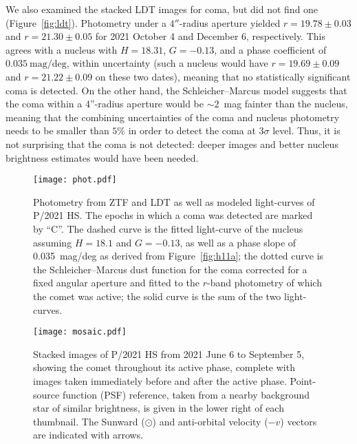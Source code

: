 \documentclass[modern]{aastex631}
\begin{document}
\begin{CJK*}{UTF8}{gbsn}
We also examined the stacked LDT images for coma, but did not find one (Figure~\ref{fig:ldt}). Photometry under a $4''$-radius aperture yielded $r=19.78\pm0.03$ and $r=21.30\pm0.05$ for 2021 October 4 and December 6, respectively. This agrees with a nucleus with $H=18.31$, $G=-0.13$, and a phase coefficient of $0.035~\mathrm{mag/deg}$, within uncertainty (such a nucleus would have $r=19.69\pm0.09$ and $r=21.22\pm0.09$ on these two dates), meaning that no statistically significant coma is detected. On the other hand, the Schleicher--Marcus model suggests that the coma within a 4''-radius aperture would be $\sim2$~mag fainter than the nucleus, meaning that the combining uncertainties of the coma and nucleus photometry needs to be smaller than $5\%$ in order to detect the coma at $3\sigma$ level. Thus, it is not surprising that the coma is not detected: deeper images and better nucleus brightness estimates would have been needed.

\begin{figure*}[h!]
\begin{center}
\texttt{[image: phot.pdf]}
\caption{Photometry from ZTF and LDT as well as modeled light-curves of P/2021 HS. The epochs in which a coma was detected are marked by ``C''. The dashed curve is the fitted light-curve of the nucleus assuming $H=18.1$ and $G=-0.13$, as well as a phase slope of 0.035~mag/deg as derived from Figure~\ref{fig:h11a}; the dotted curve is the Schleicher--Marcus dust function for the coma corrected for a fixed angular aperture and fitted to the $r$-band photometry of which the comet was active; the solid curve is the sum of the two light-curves. \label{fig:phot}}
\end{center}
\end{figure*}

\begin{figure*}
\begin{center}
\texttt{[image: mosaic.pdf]}
\caption{Stacked images of P/2021 HS from 2021 June 6 to September 5, showing the comet throughout its active phase, complete with images taken immediately before and after the active phase. Point-source function (PSF) reference, taken from a nearby background star of similar brightness, is given in the lower right of each thumbnail. The Sunward ($\odot$) and anti-orbital velocity ($-v$) vectors are indicated with arrows.\label{fig:mosaic}}
\end{center}
\end{figure*}


\end{CJK*}
\end{document}
